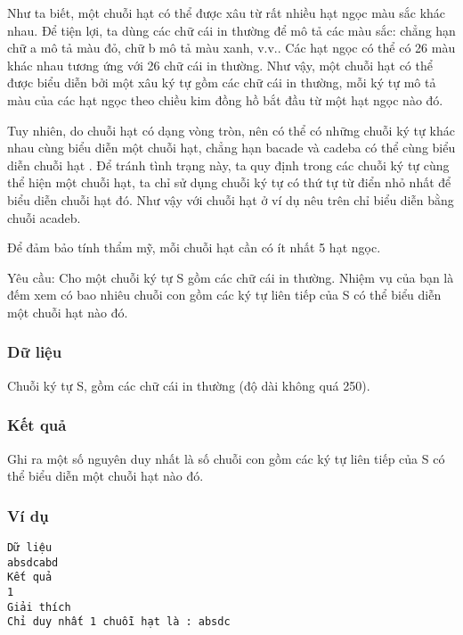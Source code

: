 



   Như ta biết, một chuỗi hạt có thể được xâu từ rất nhiều hạt ngọc màu sắc khác nhau. Để tiện lợi, ta dùng các chữ cái in thường để mô tả các màu sắc: chẳng hạn chữ a mô tả màu đỏ, chữ b mô tả màu xanh, v.v.. Các hạt ngọc có thể có 26 màu khác nhau tương ứng với 26 chữ cái in thường. Như vậy, một chuỗi hạt có thể được biểu diễn bởi một xâu ký tự gồm các chữ cái in thường, mỗi ký tự mô tả màu của các hạt ngọc theo chiều kim đồng hồ bắt đầu từ một hạt ngọc nào đó.  

   Tuy nhiên, do chuỗi hạt có dạng vòng tròn, nên có thể có những chuỗi ký tự khác nhau cùng biểu diễn một chuỗi hạt, chẳng hạn bacade và cadeba có thể cùng biểu diễn chuỗi hạt . Để tránh tình trạng này, ta quy định trong các chuỗi ký tự cùng thể hiện một chuỗi hạt, ta chỉ sử dụng chuỗi ký tự có thứ tự từ điển nhỏ nhất để biểu diễn chuỗi hạt đó. Như vậy với chuỗi hạt ở ví dụ nêu trên chỉ biểu diễn bằng chuỗi acadeb.  

   Để đảm bảo tính thẩm mỹ, mỗi chuỗi hạt cần có ít nhất 5 hạt ngọc.  

   Yêu cầu: Cho một chuỗi ký tự S gồm các chữ cái in thường. Nhiệm vụ của bạn là đếm xem có bao nhiêu chuỗi con gồm các ký tự liên tiếp của S có thể biểu diễn một chuỗi hạt nào đó.  

\subsubsection{   Dữ liệu  }

   Chuỗi ký tự S, gồm các chữ cái in thường (độ dài không quá 250).  

\subsubsection{   Kết quả  }

   Ghi ra một số nguyên duy nhất là số chuỗi con gồm các ký tự liên tiếp của S có thể biểu diễn một chuỗi hạt nào đó.  

\subsubsection{   Ví dụ  }
\begin{verbatim}
Dữ liệu
absdcabd
Kết quả
1
Giải thích
Chỉ duy nhất 1 chuỗi hạt là : absdc
\end{verbatim}